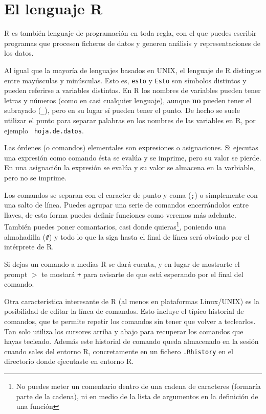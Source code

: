 \section{El lenguaje {\sf R}}


{\sf R} es también lenguaje de  programación en toda regla, con el que
puedes escribir  programas que  procesen ficheros  de datos  y generen
análisis y representaciones de los datos.

Al igual que  la mayoría de lenguajes basados en  UNIX, el lenguaje de
{\sf R} distingue entre mayúsculas y minúsculas. Esto es, {\tt esto} y
{\tt  Esto} son  símbolos  distintos y  pueden  referirse a  variables
distintas. En {\sf  R} los nombres de variables pueden  tener letras y
números  (como en  casi cualquier  lenguaje), aunque  {\bf no}  pueden
tener el  subrayado ({\tt \_}),  pero en su  lugar sí pueden  tener el
punto.  De hecho  se suele  utilizar  el punto  para separar  palabras
en  los  nombres  de  las  variables en  {\sf  R},  por  ejemplo  {\tt
hoja.de.datos}.


Las órdenes  (o comandos) elementales son  expresiones o asignaciones.
Si ejecutas  una expresión como comando  ésta se evalúa y  se imprime,
pero su valor se pierde. En una asignación la expresión se evalúa y su
valor se almacena en la varbiable, pero no se imprime.

Los comandos se  separan con el caracter  de punto y coma  ({\tt ;}) o
simplemente  con una  salto  de  línea. Puedes  agrupar  una serie  de
comandos  encerrándolos entre  llaves,  de esta  forma puedes  definir
funciones como veremos más adelante. También puedes poner comantarios,
 casi  donde quieras\footnote{No puedes  meter un
comentario dentro  de una cadena  de caracteres (formaría parte  de la
cadena), ni en medio de la lista de argumentos en la definición de una
función}, poniendo  una almohadilla ({\tt \#})  y todo lo que  la siga
hasta el final de línea será obviado por el intérprete de {\sf R}.

Si dejas  un comando a medias  {\sf R} se  dará cuenta, y en  lugar de
mostrarte el prompt  $>$ te mostará {\tt +} para  avisarte de que está
esperando por el final del comando.

Otra característica  interesante de {\sf  R} (al menos  en plataformas
Linux/UNIX)  es  la  posibilidad  de  editar  la  línea  de  comandos.
Esto  incluye  el  típico  historial   de  comandos,  que  te  permite
repetir  los comandos  sin tener  que  volver a  teclearlos. Tan  solo
utiliza los  cursores arriba y  abajo para recuperar los  comandos que
hayas tecleado.   Además este historial  de comando
queda  almacenado en  la  sesión  cuando sales  del  entorno {\sf  R},
concretamente en  un fichero  {\tt .Rhistory}  en el  directorio donde
ejecutaste en entorno {\sf R}.

